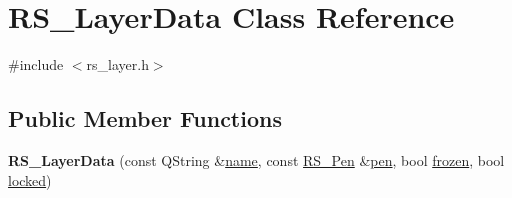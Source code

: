 \hypertarget{classRS__LayerData}{\section{R\-S\-\_\-\-Layer\-Data Class Reference}
\label{classRS__LayerData}
}


{\ttfamily \#include $<$rs\-\_\-layer.\-h$>$}

\subsection*{Public Member Functions}
\begin{DoxyCompactItemize}
\item 
\hypertarget{classRS__LayerData_ae1b04a37ffaf1afc2a91c7068893bd9c}{{\bfseries R\-S\-\_\-\-Layer\-Data} (const Q\-String \&\hyperlink{classRS__LayerData_af97ea1e664da33c1ff08c842c0c646cb}{name}, const \hyperlink{classRS__Pen}{R\-S\-\_\-\-Pen} \&\hyperlink{classRS__LayerData_af48b45bd16d5049c5cf119937e3431dc}{pen}, bool \hyperlink{classRS__LayerData_ad8354948505fd761a0adc5139583e5f5}{frozen}, bool \hyperlink{classRS__LayerData_a494d27995246b1865aabda3ce5e90974}{locked})}\label{classRS__LayerData_ae1b04a37ffaf1afc2a91c7068893bd9c}

\end{DoxyCompactItemize}
